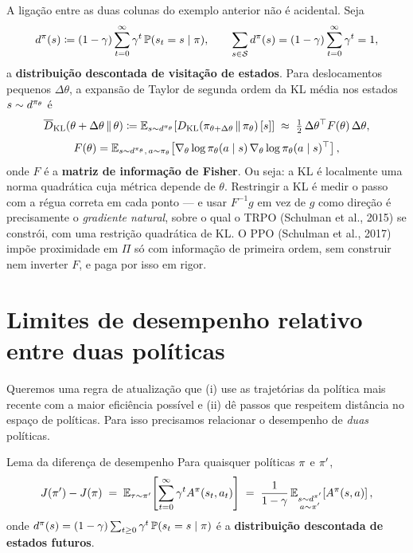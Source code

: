 \documentclass[11pt, a4paper]{article}
\newcommand{\Adv}{A}
\newcommand{\polnovo}{\pol'}
\newcommand{\dpol}{d^{\pol}}
\newcommand{\dpolnovo}{d^{\pol'}}
\newcommand{\KLd}[2]{D_{\mathrm{KL}}\!\left(#1\,\|\,#2\right)}
\newcommand{\KLbar}{\overline{D}_{\mathrm{KL}}}
\begin{document}
A ligação entre as duas colunas do exemplo anterior não é acidental. Seja
\[
  \dpol(s) \defeq (1-\gamma)\sum_{t=0}^{\infty}\gamma^t\,\Prob(s_t = s\mid\pol),
  \qquad
  \sum_{s\in\gS}\dpol(s) = (1-\gamma)\sum_{t=0}^{\infty}\gamma^t = 1,
\]
a \textbf{distribuição descontada de visitação de estados}. Para deslocamentos
pequenos $\Delta\theta$, a expansão de Taylor de segunda ordem da KL média nos
estados $s\sim d^{\pi_\theta}$ é
\[
  \KLbar(\theta + \Delta\theta \,\|\, \theta)
  \defeq \E_{s\sim d^{\pol_\theta}}\!\left[\KLd{\pol_{\theta+\Delta\theta}}{\pol_\theta}[s]\right]
  \;\approx\; \tfrac{1}{2}\,\Delta\theta^\top F(\theta)\, \Delta\theta,
\]
\[
  F(\theta) = \mathbb{E}_{s\sim d^{\pi_\theta},\, a\sim\pi_\theta}\!\left[
    \nabla_\theta \log \pi_\theta(a\mid s)\,
    \nabla_\theta \log \pi_\theta(a\mid s)^\top\right],
\]
onde $F$ é a \textbf{matriz de informação de Fisher}. Ou seja: a KL é
localmente uma norma quadrática cuja métrica depende de $\theta$. Restringir a
KL é medir o passo com a régua correta em cada ponto --- e usar $F^{-1}g$ em
vez de $g$ como direção é precisamente o \emph{gradiente natural}, sobre o qual
o TRPO (Schulman et al., 2015) se constrói, com uma restrição quadrática de KL.
O PPO (Schulman et al., 2017) impõe proximidade em $\Pi$ só com informação de
primeira ordem, sem construir nem inverter $F$, e paga por isso em rigor.

\section{Limites de desempenho relativo entre duas políticas}

Queremos uma regra de atualização que (i) use as trajetórias da política mais
recente com a maior eficiência possível e (ii) dê passos que respeitem
distância no espaço de políticas. Para isso precisamos relacionar o desempenho
de \emph{duas} políticas.

\begin{teobox}{Lema da diferença de desempenho}
Para quaisquer políticas $\pi$ e $\polnovo$,
\[
  J(\polnovo) - J(\pol)
  \;=\; \E_{\tau\sim\polnovo}\!\left[\sum_{t=0}^{\infty}\gamma^t \Adv^{\pol}(s_t,a_t)\right]
  \;=\; \frac{1}{1-\gamma}\,
        \E_{\substack{s\sim\dpolnovo\\ a\sim\polnovo}}\!\left[\Adv^{\pol}(s,a)\right],
\]
onde $\dpol(s) = (1-\gamma)\sum_{t\ge 0}\gamma^t\,\Prob(s_t = s \mid \pol)$ é a
\textbf{distribuição descontada de estados futuros}.
\end{teobox}
\end{document}
